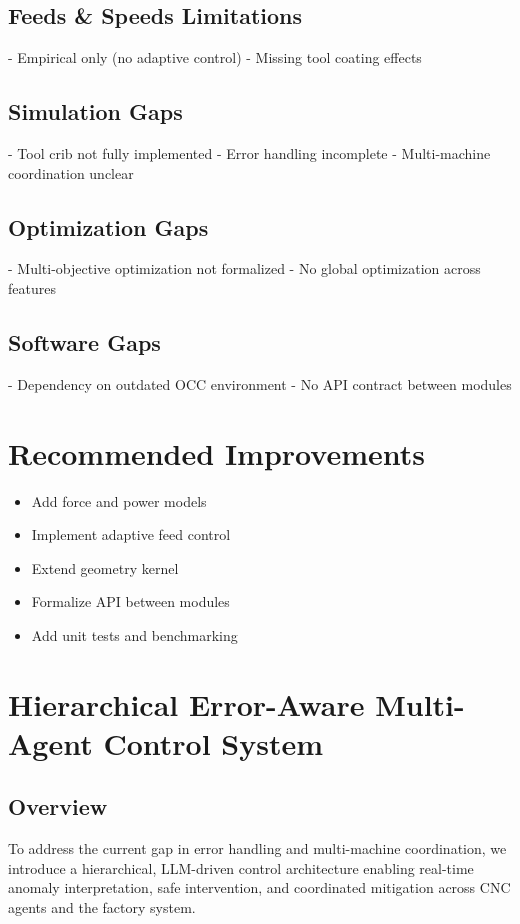 \documentclass{article}
\begin{document}
\subsection{Feeds \& Speeds Limitations}
- Empirical only (no adaptive control)
- Missing tool coating effects

\subsection{Simulation Gaps}
- Tool crib not fully implemented
- Error handling incomplete
- Multi-machine coordination unclear

\subsection{Optimization Gaps}
- Multi-objective optimization not formalized
- No global optimization across features

\subsection{Software Gaps}
- Dependency on outdated OCC environment
- No API contract between modules

\section{Recommended Improvements}
\begin{itemize}
\item Add force and power models
\item Implement adaptive feed control
\item Extend geometry kernel
\item Formalize API between modules
\item Add unit tests and benchmarking
\end{itemize}

\section{Hierarchical Error-Aware Multi-Agent Control System}

\subsection{Overview}
To address the current gap in error handling and multi-machine coordination, we introduce a hierarchical, LLM-driven control architecture enabling real-time anomaly interpretation, safe intervention, and coordinated mitigation across CNC agents and the factory system.
\end{document}
